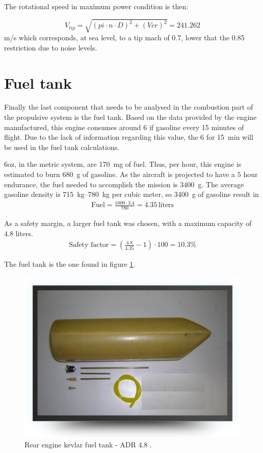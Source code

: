 \documentclass[english,fira]{ist-report}
\begin{document}
The rotational speed in maximum power condition is then: 

$$V_{tip}=\sqrt{(pi\cdot n \cdot D)^2 + (Vcr)^2} = 241.262$$m/s
which corresponds, at sea level, to a tip mach of 0.7, lower that the 0.85 restriction due to noise levels. 
\section{Fuel tank}

Finally the last component that needs to be analysed in the combustion part of the propulsive system is the fuel tank. Based on the data provided by the engine manufactured, this engine consumes around \SI{6}{\ounce} if gasoline every 15 minutes of flight. Due to the lack of information regarding this value, the \SI{6}{\ounce} for \SI{15}{\minute} will be used in the fuel tank calculations. 

6oz, in the metric system, are \SI{170}{\milli\gram} of fuel. Thus, per hour, this engine is estimated to burn \SI{680}{\gram} of gasoline. As the aircraft is projected to have a $5$ hour endurance, the fuel needed to accomplish the mission is \SI{3400}{\gram}. The average gasoline density is \SIrange{715}{780}{\kilogram} per cubic meter, so \SI{3400}{\gram} of gasoline result in 
\begin{gather*}
    \text{Fuel} = \frac{1000\cdot 3.4}{780} = 4.35\,\text{liters}
\end{gather*}

As a safety margin, a larger fuel tank was chosen, with a maximum capacity of $4.8$ liters. 
\begin{gather*}
    \text{Safety factor} = \left(\frac{4.8}{4.35}-1\right)\cdot100=10.3\%
\end{gather*}

The fuel tank is the one found in figure \ref{fig:fuel tank}.

\begin{figure}[!ht]
	\centering
	\includegraphics[width = 0.8\linewidth]{graphics/Fue_tank.png}
	\caption{Rear engine kevlar fuel tank - ADR 4.8 \cite{fueltank}.}
	\label{fig:fuel tank}
\end{figure}
\end{document}
